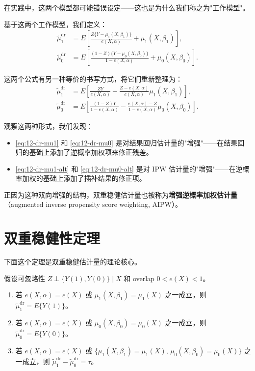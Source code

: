 在实践中，这两个模型都可能错误设定——这也是为什么我们称之为"工作模型"。

基于这两个工作模型，我们定义：
\begin{align}
\tilde\mu_1^{\mathrm{dr}} &= E\left[\frac{Z\{Y - \mu_1(X, \beta_1)\}}{e(X, \alpha)} + \mu_1(X, \beta_1)\right],
\label{eq:12-dr-mu1} \\
\tilde\mu_0^{\mathrm{dr}} &= E\left[\frac{(1-Z)\{Y - \mu_0(X, \beta_0)\}}{1-e(X, \alpha)} + \mu_0(X, \beta_0)\right].
\label{eq:12-dr-mu0}
\end{align}

这两个公式有另一种等价的书写方式，将它们重新整理为：
\begin{align}
\tilde\mu_1^{\mathrm{dr}} &= E\left[\frac{ZY}{e(X, \alpha)} - \frac{Z - e(X, \alpha)}{e(X, \alpha)} \mu_1(X, \beta_1)\right],
\label{eq:12-dr-mu1-alt} \\
\tilde\mu_0^{\mathrm{dr}} &= E\left[\frac{(1-Z)Y}{1-e(X, \alpha)} - \frac{e(X, \alpha) - Z}{1-e(X, \alpha)} \mu_0(X, \beta_0)\right].
\label{eq:12-dr-mu0-alt}
\end{align}

观察这两种形式，我们发现：
\begin{itemize}
  \item \cref{eq:12-dr-mu1} 和 \cref{eq:12-dr-mu0} 是对结果回归估计量的"增强"——在结果回归的基础上添加了逆概率加权项来修正残差。
  \item \cref{eq:12-dr-mu1-alt} 和 \cref{eq:12-dr-mu0-alt} 是对 IPW 估计量的"增强"——在逆概率加权的基础上添加了插补结果的修正项。
\end{itemize}
正因为这种双向增强的结构，双重稳健估计量也被称为\textbf{增强逆概率加权估计量}（augmented inverse propensity score weighting, AIPW）。

\section{双重稳健性定理}\label{sec:12-dr-theorem}

下面这个定理是双重稳健估计量的理论核心。

\begin{Theorem}[双重稳健性]\label{th:12-dr}
假设可忽略性 $Z \perp \{Y(1), Y(0)\} \mid X$ 和 overlap $0 < e(X) < 1$。
\begin{enumerate}
  \item 若 $e(X, \alpha) = e(X)$ 或 $\mu_1(X, \beta_1) = \mu_1(X)$ 之一成立，则 $\tilde\mu_1^{\mathrm{dr}} = E\{Y(1)\}$。
  \item 若 $e(X, \alpha) = e(X)$ 或 $\mu_0(X, \beta_0) = \mu_0(X)$ 之一成立，则 $\tilde\mu_0^{\mathrm{dr}} = E\{Y(0)\}$。
  \item 若 $e(X, \alpha) = e(X)$ 或 $\{\mu_1(X, \beta_1) = \mu_1(X), \, \mu_0(X, \beta_0) = \mu_0(X)\}$ 之一成立，则 $\tilde\mu_1^{\mathrm{dr}} - \tilde\mu_0^{\mathrm{dr}} = \tau$。
\end{enumerate}
\end{Theorem}

